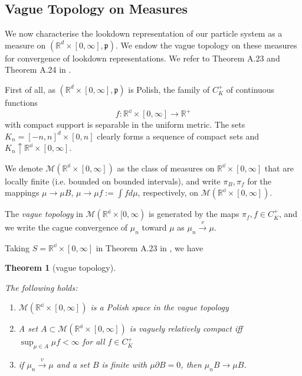 \documentclass[12pt]{article}
\newtheorem{theorem}{Theorem}[section]
\begin{document}
\subsection{Vague Topology on Measures}\label{sec: Empirical Measure Topology}

We now characterise the lookdown representation
of our particle system
as a measure on 
$(\mathbb{R}^d \times [0, \infty], \mathfrak{p})$.
We endow the vague topology
on these measures for
convergence of lookdown representations.
We refer to Theorem A.23 and Theorem A.24 in \cite{kallenberg1997foundations}.

First of all,
as $(\mathbb{R}^d \times [0, \infty], \mathfrak{p})$
is Polish,
the family of $C^{+}_K$ of continuous functions
$$f: \mathbb{R^d} \times [0, \infty] \to \mathbb{R}^{+}$$
with compact support
is separable in the uniform metric. 
The sets $K_n =[-n, n]^d \times [0,n]$ clearly forms a sequence of compact sets and $K_n \uparrow \mathbb{R^d} \times [0, \infty]$.

We denote $\mathcal{M}(\mathbb{R^d} \times [0, \infty])$ as the class of measures on $\mathbb{R^d} \times [0, \infty]$ that are 
locally finite (i.e. bounded on bounded intervals),
and write $\pi_B, \pi_f$ 
for the mappings 
$\mu \to \mu B$, $\mu \to \mu f := \int f d\mu$,
respectively,
on $\mathcal{M}(\mathbb{R^d} \times [0, \infty])$.

The \textit{vague topology} in $\mathcal{M}(\mathbb{R^d} \times [0, \infty)$ is generated by the maps $\pi_f, f \in C^{+}_K$, and 
we write the cague convergence of $\mu_n$ toward $\mu$
as $\mu_n \xrightarrow{v} \mu$.

Taking $S= \mathbb{R^d} \times [0, \infty]$
in Theorem A.23
in \cite{kallenberg1997foundations},
we have
\begin{theorem}[vague topology]
\label{teo: Kallenberg vague results}

The following holds:
\begin{enumerate}
    \item $\mathcal{M}(\mathbb{R^d} \times [0, \infty])$ is a Polish space in the vague topology
    \item A set $A \subset \mathcal{M}(\mathbb{R^d} \times [0, \infty])$ is vaguely relatively compact iff 
    $\sup_{\mu \in A} \mu f < \infty$ for all $f \in C^{+}_K$
    \item if $\mu_n \xrightarrow{v} \mu$ and a set $B$ is finite with $\mu \partial B = 0$, then $\mu_n B \to \mu B$.
\end{enumerate}

\end{theorem}
\end{document}
